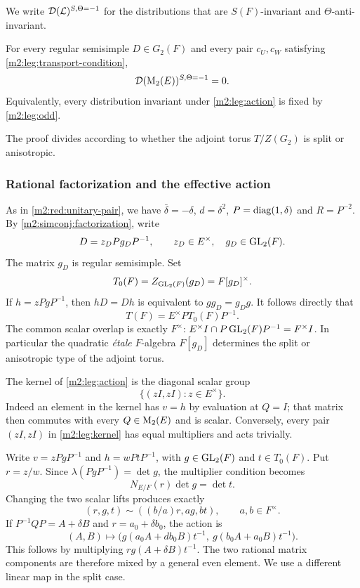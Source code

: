 We write $\mathcal D(\mathcal L)^{S,\Theta=-1}$ for the distributions
that are $S(F)$-invariant and $\Theta$-anti-invariant.

\begin{theorem}\label{m2:leg:regular}
For every regular semisimple $D\in G_2(F)$ and every pair
$c_U,c_W$ satisfying \eqref{m2:leg:transport-condition},
\[
 \mathcal D(\operatorname{M}_2(E))^{S,\Theta=-1}=0.
\]
Equivalently, every distribution invariant under \eqref{m2:leg:action}
is fixed by \eqref{m2:leg:odd}.
\end{theorem}

The proof divides according to whether the adjoint torus $T/Z(G_2)$
is split or anisotropic.

\subsubsection{Rational factorization and the effective action}

As in \cref{m2:red:unitary-pair}, we have $\bar\delta=-\delta$,
$d=\delta^2$, $P=\operatorname{diag}(1,\delta)$ and $R=P^{-2}$.
By \cref{m2:simconj:factorization}, write
\[
 D=z_DPg_DP^{-1},\qquad z_D\in E^\times,
 \quad g_D\in\operatorname{GL}_2(F).
\]
The matrix $g_D$ is regular semisimple. Set
\[
 T_0(F)=Z_{\operatorname{GL}_2(F)}(g_D)=F[g_D]^\times.
\]
If $h=zPgP^{-1}$, then $hD=Dh$ is equivalent to $gg_D=g_Dg$.
It follows directly that
\begin{equation}\label{m2:leg:rational-torus}
 T(F)=E^\times PT_0(F)P^{-1}.
\end{equation}
The common scalar overlap is exactly $F^\times$:
$E^\times I\cap P\operatorname{GL}_2(F)P^{-1}=F^\times I$.
In particular the quadratic \emph{étale} $F$-algebra $F[g_D]$
determines the split or anisotropic type of the adjoint torus.

The kernel of \eqref{m2:leg:action} is the diagonal scalar group
\begin{equation}\label{m2:leg:kernel}
 \{(zI,zI):z\in E^\times\}.
\end{equation}
Indeed an element in the kernel has $v=h$ by evaluation at $Q=I$;
that matrix then commutes with every $Q\in\operatorname{M}_2(E)$ and is scalar.
Conversely, every pair $(zI,zI)$ in \eqref{m2:leg:kernel} has equal multipliers and
acts trivially.

Write $v=zPgP^{-1}$ and $h=wPtP^{-1}$, with
$g\in\operatorname{GL}_2(F)$ and $t\in T_0(F)$. Put $r=z/w$.
Since $\lambda(PgP^{-1})=\det g$, the multiplier condition becomes
\begin{equation}\label{m2:leg:effective-triples}
 N_{E/F}(r)\det g=\det t.
\end{equation}
Changing the two scalar lifts produces exactly
\[
 (r,g,t)\sim((b/a)r,ag,bt),\qquad a,b\in F^\times.
\]
If $P^{-1}QP=A+\delta B$ and $r=a_0+\delta b_0$, the action is
\begin{equation}\label{m2:leg:mixing}
 (A,B)\longmapsto
 \bigl(g(a_0A+db_0B)t^{-1},\ g(b_0A+a_0B)t^{-1}\bigr).
\end{equation}
This follows by multiplying $r g(A+\delta B)t^{-1}$.
The two rational matrix components are therefore mixed by a general
even element. We use a different linear map in the split case.

